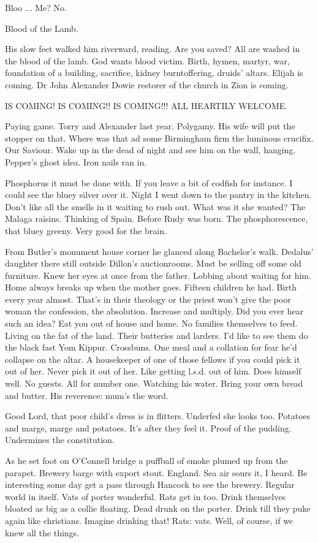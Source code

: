 Bloo ...
Me?
No.

Blood of the Lamb.

His slow feet walked him riverward, reading.
Are you saved?
All are washed in the blood of the lamb.
God wants blood victim.
Birth, hymen, martyr, war,
foundation of a building,
sacrifice,
kidney burntoffering,
druids' altars.
Elijah is coming.
Dr John Alexander Dowie restorer of the church in Zion is coming.


    IS COMING! IS COMING!! IS COMING!!!
    ALL HEARTILY WELCOME.


Paying game.
Torry and Alexander last year.
Polygamy.
His wife will
put the stopper on that.
Where was that ad some Birmingham firm the
luminous crucifix.
Our Saviour.
Wake up in the dead of night and see him
on the wall, hanging.
Pepper's ghost idea.
Iron nails ran in.

Phosphorus it must be done with.
If you leave a bit of codfish for instance.
I could see the bluey silver over it.
Night I went down to the pantry in the kitchen.
Don't like all the smells in it waiting to rush out.
What was it she wanted?
The Malaga raisins.
Thinking of Spain.
Before Rudy was born.
The phosphorescence, that bluey greeny.
Very good for the brain.

From Butler's monument house corner
he glanced along Bachelor's walk.
Dedalus' daughter there still
outside Dillon's auctionrooms.
Must be selling off some old furniture.
Knew her eyes at once from the father.
Lobbing about waiting for him.
Home always breaks up when the mother goes.
Fifteen children he had.
Birth every year almost.
That's in their theology
or the priest won't give the poor woman
the confession,
the absolution.
Increase and multiply.
Did you ever hear such an idea?
Eat you out of house and home.
No families themselves to feed.
Living on the fat of the land.
Their butteries and larders.
I'd like to see them do the
black fast Yom Kippur.
Crossbuns.
One meal and a collation for fear he'd collapse on the altar.
A housekeeper of one of those fellows
if you could pick it out of her.
Never pick it out of her.
Like getting l.s.d. out of him.
Does himself well.
No guests.
All for number one.
Watching his water.
Bring your own bread and butter.
His reverence:
mum's the word.

Good Lord, that poor child's dress is in flitters.
Underfed she looks too.
Potatoes and marge, marge and potatoes.
It's after they feel it.
Proof of the pudding.
Undermines the constitution.

As he set foot on O'Connell bridge
a puffball of smoke plumed up from the parapet.
Brewery barge with export stout.
England.
Sea air sours it, I heard.
Be interesting some day get a pass through Hancock to see the brewery.
Regular world in itself.
Vats of porter wonderful.
Rats get in too.
Drink themselves bloated as big as a collie floating.
Dead drunk on the porter.
Drink till they puke again like christians.
Imagine drinking that!
Rats: vats.
Well, of course,
if we knew all the things.


